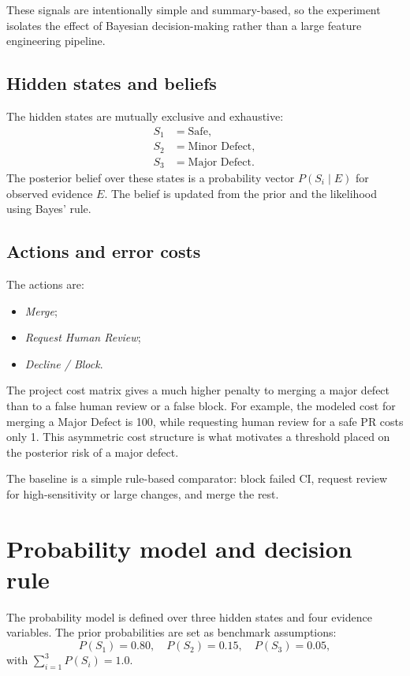 \documentclass{article}
\begin{document}
These signals are intentionally simple and summary-based, so the experiment isolates the effect of Bayesian decision-making rather than a large feature engineering pipeline.

\subsection{Hidden states and beliefs}

The hidden states are mutually exclusive and exhaustive:
\begin{align*}
S_1 &= \text{Safe}, \\
S_2 &= \text{Minor Defect}, \\
S_3 &= \text{Major Defect}.
\end{align*}
The posterior belief over these states is a probability vector $P(S_i \mid E)$ for observed evidence $E$. The belief is updated from the prior and the likelihood using Bayes' rule.

\subsection{Actions and error costs}

The actions are:
\begin{itemize}[leftmargin=1.2em, itemsep=0.2em]
    \item \emph{Merge};
    \item \emph{Request Human Review};
    \item \emph{Decline / Block}.
\end{itemize}

The project cost matrix gives a much higher penalty to merging a major defect than to a false human review or a false block. For example, the modeled cost for merging a Major Defect is 100, while requesting human review for a safe PR costs only 1. This asymmetric cost structure is what motivates a threshold placed on the posterior risk of a major defect.

The baseline is a simple rule-based comparator: block failed CI, request review for high-sensitivity or large changes, and merge the rest.

\section{Probability model and decision rule}

The probability model is defined over three hidden states and four evidence variables. The prior probabilities are set as benchmark assumptions:
\begin{equation}
P(S_1)=0.80, \quad P(S_2)=0.15, \quad P(S_3)=0.05,
\end{equation}
with $\sum_{i=1}^{3} P(S_i)=1.0$.
\end{document}
